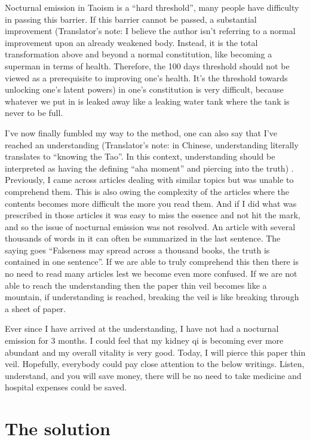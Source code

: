 \documentclass[
]{book}
\begin{document}
Nocturnal emission in Taoism is a ``hard threshold'', many people have difficulty in passing this barrier. If this barrier cannot be passed, a substantial improvement (Translator's note: I believe the author isn't referring to a normal improvement upon an already weakened body. Instead, it is the total transformation above and beyond a normal constitution, like becoming a superman in terms of health. Therefore, the 100 days threshold should not be viewed as a prerequisite to improving one's health. It's the threshold towards unlocking one's latent powers) in one's constitution is very difficult, because whatever we put in is leaked away like a leaking water tank where the tank is never to be full.

I've now finally fumbled my way to the method, one can also say that I've reached an understanding (Translator's note: in Chinese, understanding literally translates to ``knowing the Tao''. In this context, understanding should be interpreted as having the defining ``aha moment'' and piercing into the truth) . Previously, I came across articles dealing with similar topics but was unable to comprehend them. This is also owing the complexity of the articles where the contents becomes more difficult the more you read them. And if I did what was prescribed in those articles it was easy to miss the essence and not hit the mark, and so the issue of nocturnal emission was not resolved. An article with several thousands of words in it can often be summarized in the last sentence. The saying goes ``Falseness may spread across a thousand books, the truth is contained in one sentence''. If we are able to truly comprehend this then there is no need to read many articles lest we become even more confused. If we are not able to reach the understanding then the paper thin veil becomes like a mountain, if understanding is reached, breaking the veil is like breaking through a sheet of paper.

Ever since I have arrived at the understanding, I have not had a nocturnal emission for 3 months. I could feel that my kidney qi is becoming ever more abundant and my overall vitality is very good. Today, I will pierce this paper thin veil. Hopefully, everybody could pay close attention to the below writings. Listen, understand, and you will save money, there will be no need to take medicine and hospital expenses could be saved.

\hypertarget{the-solution}{%
\section{The solution}\label{the-solution}}
\end{document}
